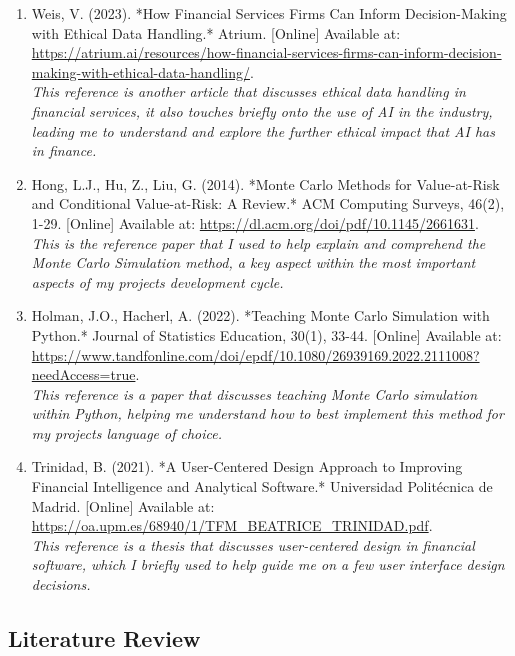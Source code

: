 \documentclass{article}
\begin{document}
\begin{small}
\begin{enumerate}
  \item\label{ref15} Weis, V. (2023). *How Financial Services Firms Can Inform Decision-Making with Ethical Data Handling.* Atrium. [Online] Available at: \url{https://atrium.ai/resources/how-financial-services-firms-can-inform-decision-making-with-ethical-data-handling/}.
  \\\textit{This reference is another article that discusses ethical data handling in financial services, it also touches briefly onto the use of AI in the industry, leading me to understand and explore the further ethical impact that AI has in finance.}

  \item\label{ref16} Hong, L.J., Hu, Z., Liu, G. (2014). *Monte Carlo Methods for Value-at-Risk and Conditional Value-at-Risk: A Review.* ACM Computing Surveys, 46(2), 1-29. [Online] Available at: \url{https://dl.acm.org/doi/pdf/10.1145/2661631}.
  \\\textit{This is the reference paper that I used to help explain and comprehend the Monte Carlo Simulation method, a key aspect within the most important aspects of my projects development cycle.}

  \item\label{ref17} Holman, J.O., Hacherl, A. (2022). *Teaching Monte Carlo Simulation with Python.* Journal of Statistics Education, 30(1), 33-44. [Online] Available at: \url{https://www.tandfonline.com/doi/epdf/10.1080/26939169.2022.2111008?needAccess=true}.
  \\\textit{This reference is a paper that discusses teaching Monte Carlo simulation within Python, helping me understand how to best implement this method for my projects language of choice.}

  \item\label{ref18} Trinidad, B. (2021). *A User-Centered Design Approach to Improving Financial Intelligence and Analytical Software.* Universidad Politécnica de Madrid. [Online] Available at: \url{https://oa.upm.es/68940/1/TFM_BEATRICE_TRINIDAD.pdf}.
  \\\textit{This reference is a thesis that discusses user-centered design in financial software, which I briefly used to help guide me on a few user interface design decisions.}
\end{enumerate}
\end{small}

\subsection{Literature Review}
\end{document}

